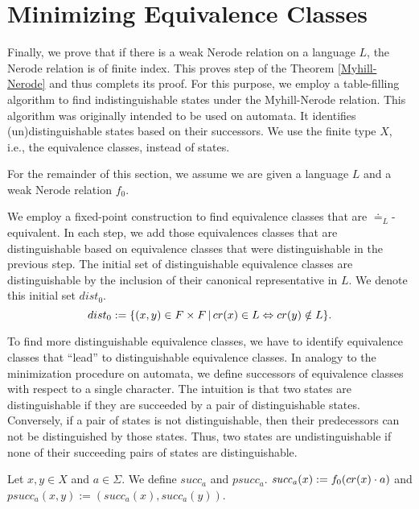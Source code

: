 \section{Minimizing Equivalence Classes}
Finally, we prove that if there is a weak Nerode relation on a language $L$, the Nerode relation is of finite index.
This proves step  of the Theorem \ref{Myhill-Nerode} and thus complets its proof.
For this purpose, we employ a table-filling algorithm \cite{Huffman1954161} to find indistinguishable states under the Myhill-Nerode relation. 
This algorithm was originally intended to be used on automata. 
It identifies (un)distinguishable states based on their successors.
We use the finite type $X$, i.e., the equivalence classes, instead of states.


For the remainder of this section, we assume we are given a language $L$ and a weak Nerode relation $f_0$. 


We employ a fixed-point construction to find equivalence classes that are $\doteq_L$-equivalent.
In each step, we add those equivalences classes that are distinguishable based on equivalence classes that were distinguishable in the previous step.
The initial set of distinguishable equivalence classes are distinguishable by the inclusion of their canonical representative in $L$. 
We denote this initial set $\mathit{dist_0}$.
\begin{equation*}
    dist_0 := \{ (x,y)  \in F \times F \, | \, cr(x) \in L \Leftrightarrow cr(y) \notin L\}.
\end{equation*}



To find more distinguishable equivalence classes, we have to identify equivalence classes that ``lead'' to distinguishable equivalence classes. 
In analogy to the minimization procedure on automata, we define successors of equivalence classes with respect to a single character.
The intuition is that two states are distinguishable if they are succeeded by a pair of distinguishable states.
Conversely, if a pair of states is not distinguishable, then their predecessors can not be distinguished by those states.
Thus, two states are undistinguishable if none of their succeeding pairs of states are distinguishable.


\begin{definition}
    Let $x,y \in X$ and $a \in \Sigma$.
    We define $\mathit{succ_a}$ and $\mathit{psucc_a}$. $\mathit{succ_a}(x) := {f_0}(cr(x)\cdot a)$ and $\mathit{psucc_a}(x,y) := (\mathit{succ_a}(x), \mathit{succ_a}(y))$.
\end{definition}

